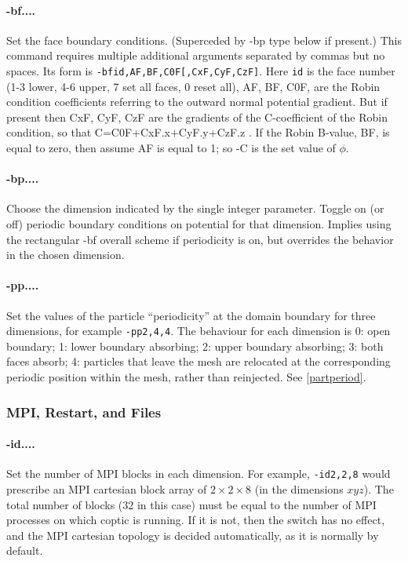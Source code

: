 \documentclass[12pt]{article}
\begin{document}
\paragraph{-bf....} Set the face boundary conditions. (Superceded by
-bp type below if present.) This command requires multiple additional
arguments separated by commas but no spaces. Its form is
\verb!-bfid,AF,BF,C0F[,CxF,CyF,CzF]!. Here \verb!id! is the face
number (1-3 lower, 4-6 upper, 7 set all faces, 0 reset all), AF, BF,
C0F, are the Robin condition coefficients referring to the outward
normal potential gradient. But if present then CxF, CyF, CzF are the
gradients of the C-coefficient of the Robin condition, so that
C=C0F+CxF.x+CyF.y+CzF.z . If the Robin B-value, BF, is equal to zero,
then assume AF is equal to 1; so -C is the set value of $\phi$.

\paragraph{-bp....} Choose the dimension indicated by the single
integer parameter. Toggle on (or off) periodic boundary conditions on
potential for that dimension. Implies using the rectangular -bf
overall scheme if periodicity is on, but overrides the behavior in the
chosen dimension.

\paragraph{-pp....} Set the values of the particle ``periodicity'' at
the domain boundary for three dimensions, for example \verb!-pp2,4,4!.
The behaviour for each dimension is 0: open boundary; 1: lower
boundary absorbing; 2: upper boundary absorbing; 3: both faces absorb;
4: particles that leave the mesh are relocated at the corresponding
periodic position within the mesh, rather than reinjected. See
\ref{partperiod}.

\subsubsection*{MPI, Restart, and Files}

\paragraph{-id....} Set the number of MPI blocks in each
dimension. For example, \verb!-id2,2,8! would prescribe an MPI
cartesian block array of $2\times2\times8$ (in the dimensions $xyz$).
The total number of blocks (32 in this case) must be equal to the
number of MPI processes on which coptic is running. If it is not, then
the switch has no effect, and the MPI cartesian topology is decided
automatically, as it is normally by default.
\end{document}
